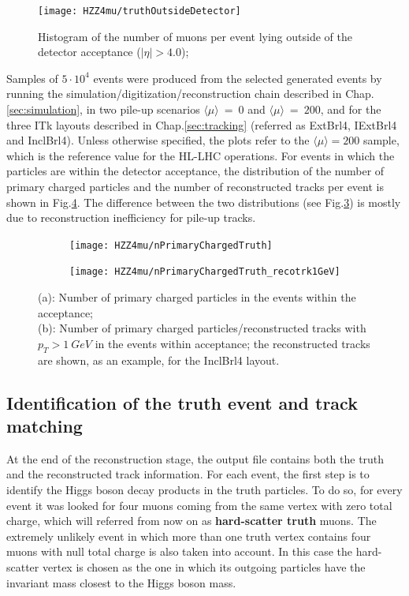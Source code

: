 \documentclass[a4paper,twoside,12pt]{book}
\begin{document}
\begin{figure}
\centering
\texttt{[image: HZZ4mu/truthOutsideDetector]}
\caption{Histogram of the number of muons per event lying outside of the detector acceptance
         	        	($|\eta| > 4.0$);\\
        	        }
\label{fig:HZZ4mu:muonAcceptance}
\end{figure}

Samples of $5 \cdot 10^4$ events were produced from the selected generated events by running
the simulation/digitization/reconstruction chain described in \mbox{Chap.\ref{sec:simulation}}, in
two pile-up scenarios  $\langle\mu\rangle\ =\ 0$ and $\langle\mu\rangle\ =\ 200$, and for the three ITk layouts described in Chap.\ref{sec:tracking} 
(referred as ExtBrl4, IExtBrl4 and InclBrl4). Unless otherwise specified, the plots refer to the $\langle\mu\rangle = 200$ sample, which is the reference
value for the HL-LHC operations. For events in which the particles are within the detector acceptance, the distribution of
the number of primary charged particles and the number of reconstructed tracks per event is shown in
Fig.\ref{fig:HZZ4mu:nTracks}. The difference between the two distributions (see \mbox{Fig.\ref{fig:HZZ4mu:nPrimaryChargedTruth_recotrk1GeV}}) is
mostly due to reconstruction inefficiency for pile-up tracks.

\begin{figure}
\begin{subfigure}{.5\linewidth}
\texttt{[image: HZZ4mu/nPrimaryChargedTruth]}
\caption{ }
\label{fig:HZZ4mu:nPrimaryChargedTruth}
\end{subfigure}
\begin{subfigure}{.5\linewidth}
\texttt{[image: HZZ4mu/nPrimaryChargedTruth\_recotrk1GeV]}
\caption{ }
\label{fig:HZZ4mu:nPrimaryChargedTruth_recotrk1GeV}
\end{subfigure}
\caption{(a): Number of primary charged particles in the events within the acceptance;\\
                  (b): Number of primary charged particles/reconstructed tracks with $p_{T} > 1\ GeV$ in the events within acceptance; the reconstructed tracks are shown, as an example, for the InclBrl4 layout.}
\label{fig:HZZ4mu:nTracks}
\end{figure}

\subsection*{Identification of the truth event and track matching}
At the end of the reconstruction stage, the output file contains both the truth and the reconstructed track information. For
each event, the first step is to identify the Higgs boson decay products in the truth particles.
To do so, for every event it was looked for four muons coming from the same vertex with zero total charge, which
will referred from now on as \textbf{hard-scatter truth} muons. The extremely unlikely event in which more
than one truth vertex contains four muons with null total charge is also taken into account. In this case 
the hard-scatter vertex is chosen as the one in which its outgoing particles have the invariant mass closest to the Higgs boson mass.\\
\end{document}
